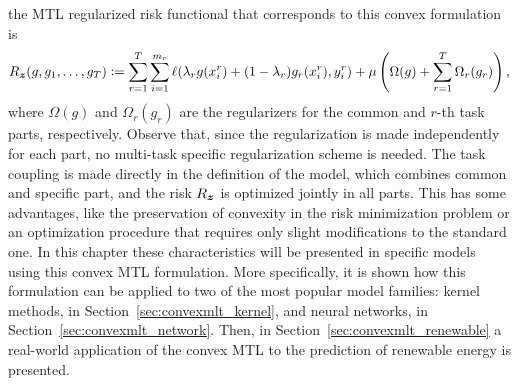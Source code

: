 the MTL regularized risk functional that corresponds to this convex formulation is 
\begin{equation}
    \label{eq:convexmtl_general_regrisk}
    \risk_{\bsample} ({g, g_1, \ldots, g_\ntasks}) \defeq \sum_{r=1}^{\ntasks} \sum_{i=1}^{\npertask_r} \lossf(\lambda_r g(x_i^r) + (1 - \lambda_r) g_r(x_i^r), y_i^r) + \mu \left(\Omega(g) + \sum_{r=1}^\ntasks \Omega_r(g_r)\right) ,
\end{equation}
where $\Omega(g)$ and $\Omega_r(g_r)$ are the regularizers for the common and $r$-th task parts, respectively. Observe that, since the regularization is made independently for each part, no multi-task specific regularization scheme is needed. The task coupling is made directly in the definition of the model, which combines common and specific part, and the risk $R_{\bm{z}}$ is optimized jointly in all parts.
This has some advantages, like the preservation of convexity in the risk minimization problem or an optimization procedure that requires only slight modifications to the standard one. In this chapter these characteristics will be presented in specific models using this convex MTL formulation.
%
More specifically, it is shown how this formulation can be applied to two of the most popular model families: kernel methods, in Section~\ref{sec:convexmlt_kernel}, and neural networks, in Section~\ref{sec:convexmlt_network}.
Then, in Section~\ref{sec:convexmlt_renewable} a real-world application of the convex MTL to the prediction of renewable energy is presented.
%




